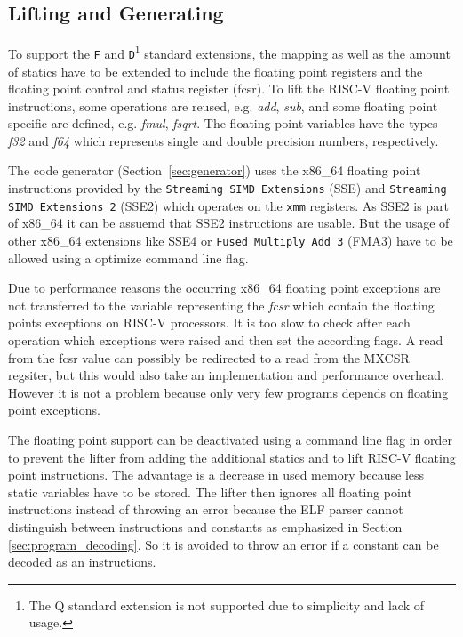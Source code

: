 \documentclass[course=eragp]{aspdoc}
\begin{document}
\subsection{Lifting and Generating}

To support the \texttt{F} and \texttt{D}\footnote{The Q standard extension is not supported due to simplicity and lack of usage.}
standard extensions, the mapping as well as the amount of statics have to be extended to include the
floating point registers and the floating point control and status register (fcsr). To lift the
RISC-V floating point instructions, some operations are reused, e.g. \emph{add}, \emph{sub}, and some floating
point specific are defined, e.g. \emph{fmul}, \emph{fsqrt}. The floating point variables have the
types \emph{f32} and \emph{f64} which represents single and double precision numbers, respectively.

\par

The code generator (Section~\ref{sec:generator}) uses the x86\_64 floating point instructions
provided by the \texttt{Streaming SIMD Extensions} (SSE) and \texttt{Streaming SIMD Extensions 2}
(SSE2) which operates on the \texttt{xmm} registers. As SSE2 is part of x86\_64 it can be assuemd
that SSE2 instructions are usable. But the usage of other x86\_64 extensions like SSE4 or
\texttt{Fused Multiply Add 3} (FMA3) have to be allowed using a optimize command line flag.

\par

Due to performance reasons the occurring x86\_64 floating point exceptions are not transferred to
the variable representing the \emph{fcsr} which contain the floating points exceptions on RISC-V
processors. It is too slow to check after each operation which exceptions were raised and then set
the according flags. A read from the fcsr value can possibly be redirected to a read from the MXCSR
regsiter, but this would also take an implementation and performance overhead. However it is not a problem
because only very few programs depends on floating point exceptions.

\par

The floating point support can be deactivated using a command line flag in order to prevent the
lifter from adding the additional statics and to lift RISC-V floating point instructions. The
advantage is a decrease in used memory because less static variables have to be stored. The lifter
then ignores all floating point instructions instead of throwing an error because the ELF parser
cannot distinguish between instructions and constants as emphasized in Section
\ref{sec:program_decoding}. So it is avoided to throw an error if a constant can be decoded as an
instructions.
\end{document}

